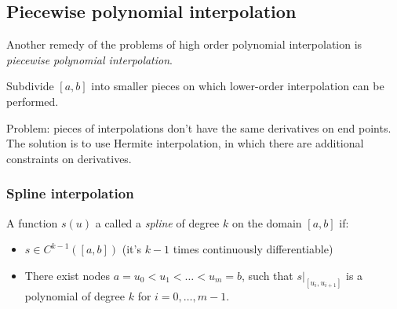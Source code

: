 \pagebreak
\subsection{Piecewise polynomial interpolation}
Another remedy of the problems of high order polynomial interpolation is
\textit{piecewise polynomial interpolation}.

Subdivide $[a, b]$ into smaller pieces on which lower-order interpolation can be performed.
\begin{center}   
\end{center}
Problem: pieces of interpolations don't have the same derivatives on end points.
The solution is to use Hermite interpolation, in which
there are additional constraints on derivatives.

\subsubsection*{Spline interpolation}
\begin{definition}
    A function $s(u)$ a called a \textit{spline} of degree $k$ on the domain
    $[a, b]$ if:
    \begin{itemize}
        \item {
            $s \in C^{k - 1}([a, b])$ (it's $k - 1$ times continuously differentiable)
        }
        \item {
            There exist nodes $a = u_0 < u_1 < \dots < u_m = b$, such that
            $s|_{[u_i, u_{i+1}]}$ is a polynomial of degree $k$
            for $i = 0, \dots, m - 1$.
        }
    \end{itemize}
\end{definition}

